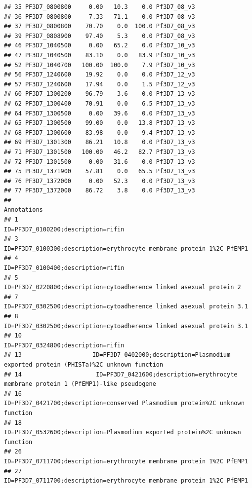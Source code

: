 \documentclass[12pt, a4paper]{article}\usepackage[]{graphicx}\usepackage[]{color}
\makeatletter
\newenvironment{kframe}{%
 \def\at@end@of@kframe{}%
 \ifinner\ifhmode%
  \def\at@end@of@kframe{\end{minipage}}%
  \begin{minipage}{\columnwidth}%
 \fi\fi%
 \def\FrameCommand##1{\hskip\@totalleftmargin \hskip-\fboxsep
 \colorbox{shadecolor}{##1}\hskip-\fboxsep
     \hskip-\linewidth \hskip-\@totalleftmargin \hskip\columnwidth}%
 \MakeFramed {\advance\hsize-\width
   \@totalleftmargin\z@ \linewidth\hsize
   \@setminipage}}%
 {\par\unskip\endMakeFramed%
 \at@end@of@kframe}
\newenvironment{knitrout}{}{} %
\makeatother
\begin{document}
\begin{knitrout}
\begin{kframe}
\begin{verbatim}
## 35 PF3D7_0800800     0.00   10.3    0.0 Pf3D7_08_v3
## 36 PF3D7_0800800     7.33   71.1    0.0 Pf3D7_08_v3
## 37 PF3D7_0800800    70.70    0.0  100.0 Pf3D7_08_v3
## 39 PF3D7_0808900    97.40    5.3    0.0 Pf3D7_08_v3
## 46 PF3D7_1040500     0.00   65.2    0.0 Pf3D7_10_v3
## 47 PF3D7_1040500    83.10    0.0   83.9 Pf3D7_10_v3
## 52 PF3D7_1040700   100.00  100.0    7.9 Pf3D7_10_v3
## 56 PF3D7_1240600    19.92    0.0    0.0 Pf3D7_12_v3
## 57 PF3D7_1240600    17.94    0.0    1.5 Pf3D7_12_v3
## 60 PF3D7_1300200    96.79    3.6    0.0 Pf3D7_13_v3
## 62 PF3D7_1300400    70.91    0.0    6.5 Pf3D7_13_v3
## 64 PF3D7_1300500     0.00   39.6    0.0 Pf3D7_13_v3
## 65 PF3D7_1300500    99.00    0.0   13.8 Pf3D7_13_v3
## 68 PF3D7_1300600    83.98    0.0    9.4 Pf3D7_13_v3
## 69 PF3D7_1301300    86.21   10.8    0.0 Pf3D7_13_v3
## 71 PF3D7_1301500   100.00   46.2   82.7 Pf3D7_13_v3
## 72 PF3D7_1301500     0.00   31.6    0.0 Pf3D7_13_v3
## 75 PF3D7_1371900    57.81    0.0   65.5 Pf3D7_13_v3
## 76 PF3D7_1372000     0.00   52.3    0.0 Pf3D7_13_v3
## 77 PF3D7_1372000    86.72    3.8    0.0 Pf3D7_13_v3
##                                                                                                 Annotations
## 1                                                                        ID=PF3D7_0100200;description=rifin
## 3                                     ID=PF3D7_0100300;description=erythrocyte membrane protein 1%2C PfEMP1
## 4                                                                        ID=PF3D7_0100400;description=rifin
## 5                                       ID=PF3D7_0220800;description=cytoadherence linked asexual protein 2
## 7                                     ID=PF3D7_0302500;description=cytoadherence linked asexual protein 3.1
## 8                                     ID=PF3D7_0302500;description=cytoadherence linked asexual protein 3.1
## 10                                                                       ID=PF3D7_0324800;description=rifin
## 13                    ID=PF3D7_0402000;description=Plasmodium exported protein (PHISTa)%2C unknown function
## 14                     ID=PF3D7_0421600;description=erythrocyte membrane protein 1 (PfEMP1)-like pseudogene
## 16                            ID=PF3D7_0421700;description=conserved Plasmodium protein%2C unknown function
## 18                             ID=PF3D7_0532600;description=Plasmodium exported protein%2C unknown function
## 26                                    ID=PF3D7_0711700;description=erythrocyte membrane protein 1%2C PfEMP1
## 27                                    ID=PF3D7_0711700;description=erythrocyte membrane protein 1%2C PfEMP1

\end{verbatim}
\end{kframe}
\end{knitrout}
\end{document}
